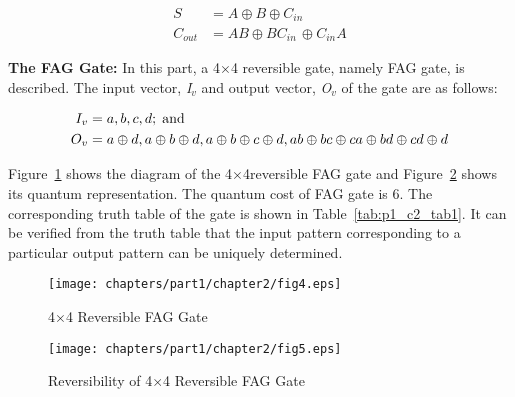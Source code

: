 \begin{align*}
S &= A \oplus  B \oplus  C{}_{in}\\
C{}_{out} &= AB \oplus  BC{}_{in\ }\oplus  C{}_{in}A
\end{align*}

\noindent\textbf{The FAG Gate:} In this part, a {4$\times$4} reversible gate, namely FAG gate, is described. The input vector, {\it I${}_{v}$} and output vector, {\it O${}_{v}$} of the gate are as follows:

\begin{align*}
I_{v} &= {a, b, c, d}; \;\textnormal{and}\\
O_{v} &= {a\oplus d, a\oplus b\oplus d, a\oplus b\oplus c\oplus d, ab\oplus bc\oplus ca\oplus bd\oplus cd\oplus d}
\end{align*}

Figure~\ref{fig:p1_c2_fig4} shows the diagram of the {4$\times$4}reversible FAG gate and Figure~\ref{fig:p1_c2_fig5} shows its quantum representation. The quantum cost of FAG gate is 6. The corresponding truth table of the gate is shown in Table~\ref{tab:p1_c2_tab1}. It can be verified from the truth table that the input pattern corresponding to a particular output pattern can be uniquely determined.

\begin{figure}[!tbh]
	\centering
	\texttt{[image: chapters/part1/chapter2/fig4.eps]}
	\caption{{4$\times$4} Reversible FAG Gate}
	\label{fig:p1_c2_fig4}
\end{figure}

\begin{figure}[!tbh]
	\centering
	\texttt{[image: chapters/part1/chapter2/fig5.eps]}
	\caption{Reversibility of {4${\times}$4} Reversible FAG Gate}
	\label{fig:p1_c2_fig5}
\end{figure}

